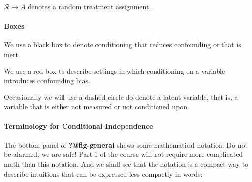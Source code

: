 \documentclass[
  single column]{article}
\let\oldparagraph\paragraph
\renewcommand{\paragraph}[1]{\oldparagraph{#1}\mbox{}}
\begin{document}
\(\mathcal{R}\to A\) denotes a random treatment assignment.

\paragraph{Boxes}\label{boxes}

We use a black box to denote conditioning that reduces confounding or
that is inert.

We use a red box to describe settings in which conditioning on a
variable introduces confounding bias.

Occasionally we will use a dashed circle do denote a latent variable,
that is, a variable that is either not measured or not conditioned upon.

\paragraph{Terminology for Conditional
Independence}\label{terminology-for-conditional-independence}

The bottom panel of \textbf{?@fig-general} shows some mathematical
notation. Do not be alarmed, we are safe! Part 1 of the course will not
require more complicated math than this notation. And we shall see that
the notation is a compact way to describe intuitions that can be
expressed less compactly in words:
\end{document}
